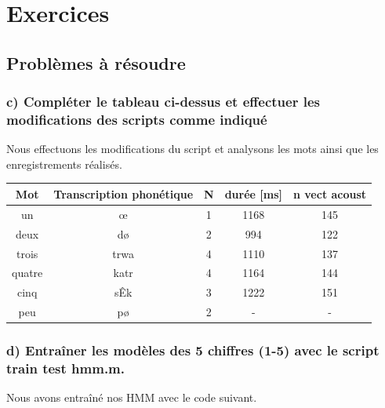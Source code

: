 
\chapter{Exercices} %

\label{Chapitre 2} %


\section{Problèmes à résoudre}

\subsection{c) Compléter le tableau ci-dessus et effectuer les modifications des scripts comme indiqué}

Nous effectuons les modifications du script et analysons les mots ainsi que les enregistrements réalisés.

\begin{tabular}{|c|c|c|c|c|}
\hline 
Mot & Transcription phonétique & N & durée [ms] & n vect acoust \\ 
\hline 
un & œ & 1 & 1168 & 145 \\ 
\hline 
deux & dø & 2 & 994 & 122 \\ 
\hline 
trois & trwa & 4 & 1110 & 137 \\ 
\hline 
quatre & katr & 4 & 1164 & 144 \\ 
\hline 
cinq & sÊk & 3 & 1222 & 151 \\ 
\hline 
peu & pø & 2 & - & - \\ 
\hline 
\end{tabular}

\subsection{d) Entraîner les modèles des 5 chiffres (1-5) avec le script train test hmm.m.}

Nous avons entraîné nos HMM avec le code suivant.

